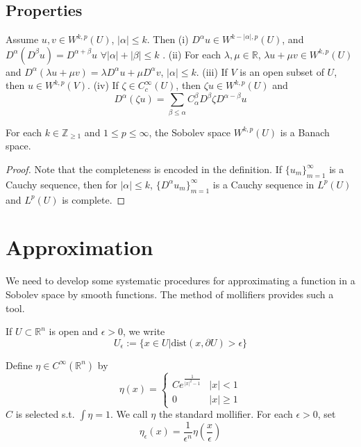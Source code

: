 \subsection{Properties}
\begin{theorem}
    Assume $u,v\in W^{k,p}(U)$, $|\alpha|\le k$. Then \newline 
    (i) $D^\alpha u\in W^{k-|\alpha|,p}(U)$, and $D^\alpha(D^\beta u) =D^{\alpha+\beta}u$ $\forall |\alpha|+|\beta|\le k$ .\newline 
    (ii) For each $\lambda,\mu\in\mathbb{R}$, $\lambda u+\mu v\in W^{k,p}(U)$ and $D^\alpha(\lambda u+\mu v)=\lambda D^\alpha u+\mu D^\alpha v$, $|\alpha|\le k$.\newline 
    (iii) If $V$ is an open subset of $U$, then $u\in W^{k,p}(V)$.\newline 
    (iv) If $\zeta\in C^\infty_c(U)$, then $\zeta u\in W^{k,p}(U)$ and 
    \[ D^\alpha(\zeta u)=\sum_{\beta\le \alpha}C_\alpha^\beta D^\beta\zeta D^{\alpha-\beta}u \]
\end{theorem}

\begin{theorem}
    For each $k\in\mathbb{Z}_{\ge 1}$ and $1\le p\le\infty$, the Sobolev space $W^{k,p}(U)$ is a Banach space.
\end{theorem}
\begin{proof}
    Note that the completeness is encoded in the definition. If $\{u_m\}_{m=1}^\infty$ is a Cauchy sequence, then for $|\alpha|\le k$, $\{D^\alpha u_m\}_{m=1}^\infty$
    is a Cauchy sequence in $L^p(U)$ and $L^p(U)$ is complete.
\end{proof}

\section{Approximation}
We need to develop some systematic procedures for approximating a function in a Sobolev space by smooth functions. 
The method of mollifiers provides such a tool.
\begin{notation}
    If $U\subset \mathbb{R}^n$ is open and $\epsilon>0$, we write 
    \[ U_\epsilon:=\{x\in U|\text{dist}(x,\partial U)>\epsilon\} \]
\end{notation}

\begin{definition}
    Define $\eta\in C^\infty(\mathbb{R}^n)$ by \[\eta (x)=\left\{\begin{matrix}
        Ce^{\frac{1}{|x|^2-1}} & |x|<1\\
        0 & |x|\ge 1
       \end{matrix}\right.\] 
       $C$ is selected s.t. $\int \eta =1$. We call $\eta$ the standard mollifier.\newline 
       For each $\epsilon>0$, set \[\eta_\epsilon(x)=\frac{1}{\epsilon^n}\eta(\frac{x}{\epsilon})\]
\end{definition}

